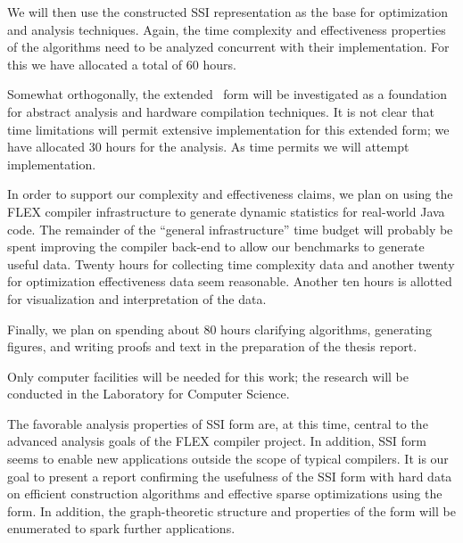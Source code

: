 \documentclass[12pt,oneside]{article}
\begin{document}
We will then use the constructed SSI representation as the base for
optimization and analysis techniques.  Again, the time complexity and
effectiveness properties of the algorithms need to be analyzed
concurrent with their implementation.  For this we have allocated a
total of 60 hours.

Somewhat orthogonally, the extended \ssiplus\ form will be
investigated as a foundation for abstract analysis and hardware
compilation techniques.  It is not clear that time limitations will
permit extensive implementation for this extended form; we have
allocated 30 hours for the analysis.  As time permits we will attempt
implementation.

In order to support our complexity and effectiveness claims, we plan
on using the FLEX compiler infrastructure to generate dynamic
statistics for real-world Java code.  The remainder of the ``general
infrastructure'' time
budget will probably be spent improving the compiler back-end to allow
our benchmarks to generate useful data.  Twenty hours for collecting time
complexity data and another twenty for optimization effectiveness data
seem reasonable.  Another ten hours is allotted for visualization and
interpretation of the data.

Finally, we plan on spending about 80 hours clarifying algorithms,
generating figures, and writing proofs and text in the preparation of
the thesis report.

Only computer facilities will be needed for this work; the research
will be conducted in the Laboratory for Computer Science.

The favorable analysis properties of SSI form are, at this time,
central to the advanced analysis goals of the FLEX compiler project.
In addition, SSI form seems to enable new applications outside the
scope of typical compilers.  It is our goal to present a report
confirming the usefulness of the SSI form with hard data on
efficient construction algorithms and effective sparse optimizations
using the form.  In addition, the graph-theoretic structure and
properties of the form will be enumerated to spark further applications.


\end{document}
